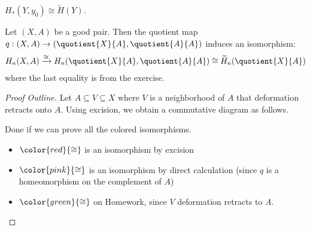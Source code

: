\begin{exercise}
	$H_\ast(Y, y_0) \cong \widetilde{H}(Y)$.
\end{exercise}

\begin{theorem}\label{thm:good-pairs-relative-homology}
	Let $(X, A)$ be a good pair. Then the quotient map $q : (X, A) \to (\quotient{X}{A} , \quotient{A}{A} )$ induces an isomorphism:
	\begin{align*}
		H_n(X, A) \xrightarrow{\cong} H_n(\quotient{X}{A}, \quotient{A}{A}) \cong \widetilde{H}_n(\quotient{X}{A})
	\end{align*}
	where the last equality is from the exercise.
\end{theorem}

\begin{proof}[Proof Outline]
	Let $A \subseteq V \subseteq X$ where $V$ is a neighborhood of $A$ that deformation retracts onto $A$. Using excision, we obtain a commutative diagram as follows.
	\par

	\par Done if we can prove all the colored isomorphisms.
	\begin{itemize}
		\item $\color{red}{\cong}$ is an isomorphism by excision
		\item $\color{pink}{\cong}$ is an isomorphism by direct calculation (since $q$ is a homeomorphism on the complement of $A$)
		\item $\color{green}{\cong}$ on Homework, since $V$ deformation retracts to $A$.
	\end{itemize}
\end{proof}
